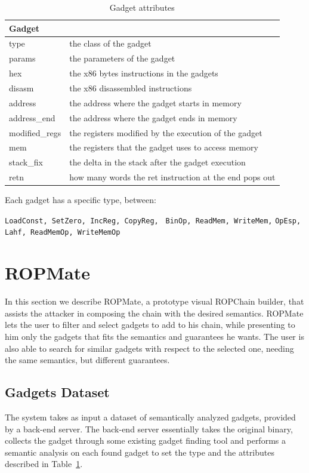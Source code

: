 \documentclass[twocolumn, 11pt]{article}
\begin{document}
\begin{table}[htb]
\caption{Gadget attributes}\label{tab:gad_attr}
\centering
  \begin{tabular}{|l|l|}
    \hline
    \textbf{Gadget} & \\ \hline
    type & the class of the gadget \\ \hline
    params & the parameters of the gadget \\ \hline
    hex & the x86 bytes instructions in the gadgets \\ \hline
    disasm & the x86 disassembled instructions \\ \hline
    address & the address where the gadget starts in memory \\ \hline
    address\_end & the address where the gadget ends in memory \\ \hline
    modified\_regs & the registers modified by the execution of the gadget \\ \hline
    mem & the registers that the gadget uses to access memory \\ \hline
    stack\_fix & the delta in the stack after the gadget execution \\ \hline
    retn & how many words the ret instruction at the end pops out \\ \hline
  \end{tabular}
\end{table}

\bigskip
Each gadget has a specific type, between:

\begin{center}
\noindent\texttt{LoadConst, SetZero, IncReg, CopyReg, }
\noindent\texttt{BinOp, ReadMem, WriteMem,}
\noindent\texttt{OpEsp, Lahf, ReadMemOp, WriteMemOp}
\end{center}

\section{ROPMate}
In this section we describe ROPMate, a prototype visual ROPChain builder, that assists the attacker in composing the chain with the desired semantics. ROPMate lets the user to filter and select gadgets to add to his chain, while presenting to him only the gadgets that fits the semantics and guarantees he wants. The user is also able to search for similar gadgets with respect to the selected one, needing the same semantics, but different guarantees.

\subsection{Gadgets Dataset} The system takes as input a dataset of semantically analyzed gadgets, provided by a back-end server. The back-end server essentially takes the original binary, collects the gadget through some existing gadget finding tool and performs a semantic analysis on each found gadget to set the type and the attributes described in Table~\ref{tab:gad_attr}.
\end{document}
